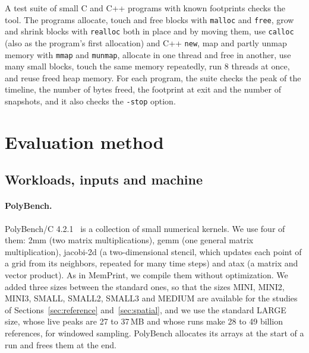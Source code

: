 \documentclass[11pt]{article}
\newcommand{\memprint}{MemPrint}
\newcommand{\knob}[1]{\texttt{-#1}}
\begin{document}
A test suite of small C and C++ programs with known footprints checks the tool. The programs allocate, touch and free blocks with \texttt{malloc} and \texttt{free}, grow and shrink blocks with \texttt{realloc} both in place and by moving them, use \texttt{calloc} (also as the program's first allocation) and C++ \texttt{new}, map and partly unmap memory with \texttt{mmap} and \texttt{munmap}, allocate in one thread and free in another, use many small blocks, touch the same memory repeatedly, run 8 threads at once, and reuse freed heap memory. For each program, the suite checks the peak of the timeline, the number of bytes freed, the footprint at exit and the number of snapshots, and it also checks the \knob{stop} option.

\section{Evaluation method}
\label{sec:method}

\subsection{Workloads, inputs and machine}

\paragraph{PolyBench.}
PolyBench/C 4.2.1~\cite{polybench} is a collection of small numerical kernels. We use four of them: 2mm (two matrix multiplications), gemm (one general matrix multiplication), jacobi-2d (a two-dimensional stencil, which updates each point of a grid from its neighbors, repeated for many time steps) and atax (a matrix and vector product). As in \memprint{}, we compile them without optimization. We added three sizes between the standard ones, so that the sizes MINI, MINI2, MINI3, SMALL, SMALL2, SMALL3 and MEDIUM are available for the studies of Sections~\ref{sec:reference} and~\ref{sec:spatial}, and we use the standard LARGE size, whose live peaks are 27 to 37\,MB and whose runs make 28 to 49 billion references, for windowed sampling. PolyBench allocates its arrays at the start of a run and frees them at the end.
\end{document}
